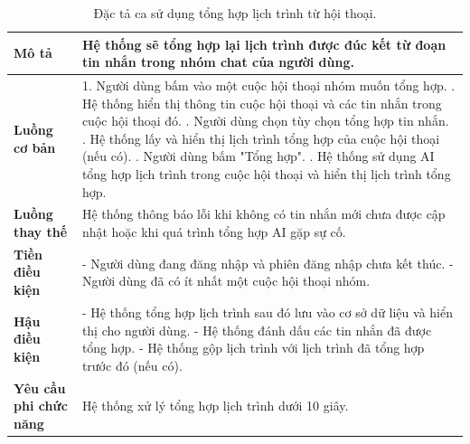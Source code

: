 \begin{longtable}{| p{4cm} | p{\dimexpr\linewidth-4cm-4\tabcolsep} |} %
    \caption{Đặc tả ca sử dụng tổng hợp lịch trình từ hội thoại.} %
    \label{tab:uc_summarize_itinerary_spec} \\ %

    \hline
    \textbf{Mô tả} & Hệ thống sẽ tổng hợp lại lịch trình được đúc kết từ đoạn tin nhắn trong nhóm chat của người dùng. \\
    \hline
    \endfirsthead %



    \hline %
    \endlastfoot

    \textbf{Luồng cơ bản} & 1. Người dùng bấm vào một cuộc hội thoại nhóm muốn tổng hợp. \newline
                           2. Hệ thống hiển thị thông tin cuộc hội thoại và các tin nhắn trong cuộc hội thoại đó. \newline
                           3. Người dùng chọn tùy chọn tổng hợp tin nhắn. \newline
                           4. Hệ thống lấy và hiển thị lịch trình tổng hợp của cuộc hội thoại (nếu có). \newline
                           5. Người dùng bấm "Tổng hợp". \newline
                           6. Hệ thống sử dụng AI tổng hợp lịch trình trong cuộc hội thoại và hiển thị lịch trình tổng hợp. \\
    \hline
    \textbf{Luồng thay thế} & Hệ thống thông báo lỗi khi không có tin nhắn mới chưa được cập nhật hoặc khi quá trình tổng hợp AI gặp sự cố. \\
    \hline
    \textbf{Tiền điều kiện} & - Người dùng đang đăng nhập và phiên đăng nhập chưa kết thúc. \newline
                           - Người dùng đã có ít nhất một cuộc hội thoại nhóm. \\
    \hline
    \textbf{Hậu điều kiện} & - Hệ thống tổng hợp lịch trình sau đó lưu vào cơ sở dữ liệu và hiển thị cho người dùng. \newline
                           - Hệ thống đánh dấu các tin nhắn đã được tổng hợp. \newline
                           - Hệ thống gộp lịch trình với lịch trình đã tổng hợp trước đó (nếu có). \\
    \hline
    \textbf{Yêu cầu phi chức năng} & Hệ thống xử lý tổng hợp lịch trình dưới 10 giây. \\

\end{longtable}


